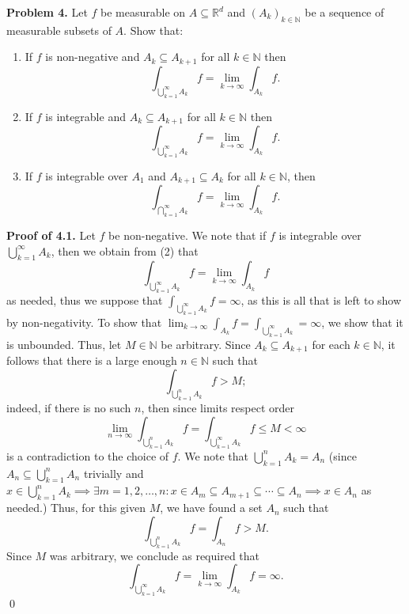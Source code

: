 \noindent \textbf{Problem 4.} Let \( f \) be measurable on \( A \subseteq \mathbb{R}^{d}  \) and \( (A_{k} )_{k \in \mathbb{N} }  \) be a sequence of measurable subsets of \( A \). Show that:
\begin{enumerate}
	\item If \( f \) is non-negative and \( A_{k} \subseteq A_{k+1}  \) for all \( k \in \mathbb{N}  \) then \[\int_{\bigcup_{k=1}^{\infty} A_{k} } f = \lim_{{k} \to {\infty}} \int_{A_{k} } f.\]
	\item If \( f \) is integrable and \( A_{k} \subseteq A_{k+1}  \) for all \( k \in \mathbb{N}  \) then \[\int_{\bigcup_{k=1}^{\infty} A_{k} } f = \lim_{{k} \to {\infty}} \int_{A_{k} } f.\]
	\item If \( f \) is integrable over \( A_1 \) and \( A_{k+1} \subseteq A_{k}  \) for all \( k \in \mathbb{N}  \), then \[\int_{\bigcap_{k=1}^{\infty} A_{k} } f = \lim_{{k} \to {\infty}} \int_{A_{k} } f.\] 
\end{enumerate}
\noindent \textbf{Proof of 4.1.} Let \( f \) be non-negative. We note that if \( f \) is integrable over \( \bigcup_{k=1}^{\infty} A_{k}  \), then we obtain from (2) that \[\int_{\bigcup_{k=1}^{\infty} A_{k} } f = \lim_{{k} \to {\infty}} \int_{A_{k} } f\] as needed, thus we suppose that \( \int_{\bigcup_{k=1}^{\infty} A_{k} } f = \infty \), as this is all that is left to show by non-negativity. To show that \( \lim_{{k} \to {\infty}} \int_{A_{k} } f = \int_{\bigcup_{k=1}^{\infty} A_{k} } = \infty \), we show that it is unbounded. Thus, let \( M \in \mathbb{N}  \) be arbitrary. Since \( A_{k} \subseteq A_{k+1}  \) for each \( k \in \mathbb{N}  \), it follows that there is a large enough \( n \in \mathbb{N}  \) such that \[ \int_{\bigcup_{k=1}^{n} A_{k} } f > M; \] indeed, if there is no such \( n \), then since limits respect order \[\lim_{{n} \to {\infty}} \int_{\bigcup_{k=1}^{n} A_{k} } f = \int_{\bigcup_{k=1}^{\infty} A_{k} } f \leq M < \infty\] is a contradiction to the choice of \( f \). We note that \( \bigcup_{k=1}^{n} A_{k} = A_{n}  \) (since \( A_{n} \subseteq \bigcup_{k=1}^{n} A_{n}  \) trivially and \( x \in \bigcup_{k=1}^{n} A_{k}   \implies \exists m = 1, 2, \hdots , n : x \in A_{m} \subseteq A_{m+1}\subseteq \cdots \subseteq A_{n} \implies x \in A_{n}   \) as needed.) Thus, for this given \( M \), we have found a set \( A_{n}  \) such that \[\int_{\bigcup_{k=1}^{n} A_{k} }f = \int_{A_{n} } f > M .\] Since \( M \) was arbitrary, we conclude as required that \[\int_{\bigcup_{k=1}^{\infty} A_{k} } f = \lim_{{k} \to {\infty}} \int_{A_{k} } f = \infty.\] \qed

